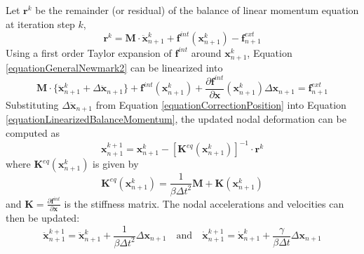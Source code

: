 \documentclass[oneside,11pt,times]{book}
\begin{document}
Let $\bm{r}^{k}$ be the remainder (or residual) of the balance of linear momentum equation at iteration step $k$,
%
\begin{equation} \label{equationResidualMomentum}
 \bm{r}^{k} = \bm{M} \cdot \ddot{\bm{x}}^{k}_{n+1} + \bm{f}^{int}(\bm{x}^{k}_{n+1}) -
 \bm{f}^{ext}_{n+1}
\end{equation}
%
Using a first order Taylor expansion of $\bm{f}^{int}$ around $\bm{x}^{k}_{n+1}$, Equation \eqref{equationGeneralNewmark2} can be linearized into
%
\begin{equation} \label{equationLinearizedBalanceMomentum}
 \bm{M} \cdot \{\ddot{\bm{x}}^{k}_{n+1} + \Delta \ddot{\bm{x}}_{n+1}\} + \bm{f}^{int}
 (\bm{x}^{k}_{n+1}) + \frac{\partial \bm{f}^{int}}{\partial \bm{x}}(\bm{x}^{k}_{n+1})
 \Delta \bm{x}_{n+1} = \bm{f}^{ext}_{n+1}
\end{equation}
%
Substituting $\Delta \ddot{\bm{x}}_{n+1}$ from Equation \eqref{equationCorrectionPosition} into Equation \eqref{equationLinearizedBalanceMomentum}, the updated nodal deformation can be computed as
%
\begin{equation} \label{equationUpdatedPosition}
 \bm{x}^{k+1}_{n+1} = \bm{x}^{k}_{n+1} - [\bm{K}^{eq}(\bm{x}^{k}_{n+1})]^{-1} \cdot \bm{r}^{k}
\end{equation}
%
where $\bm{K}^{eq}(\bm{x}^{k}_{n+1})$ is given by
%
\begin{equation} \label{equationJacobianMatrix}
 \bm{K}^{eq}(\bm{x}^{k}_{n+1}) = \frac{1}{\beta \Delta t^2} \bm{M} + \bm{K} (\bm{x}^{k}_{n+1})
\end{equation}
%
and $\bm{K} = \frac{\partial \bm{f}^{int}}{\partial \bm{x}}$ is the stiffness matrix. The nodal accelerations and velocities can then be updated:
%
\begin{equation} \label{equationUpdatedAccelerationVelocity}
 \ddot{\bm{x}}^{k+1}_{n+1} = \ddot{\bm{x}}^{k}_{n+1} + \frac{1}{\beta \Delta t^2} \Delta
 \bm{x}_{n+1} \quad \textrm{and} \quad  \dot{\bm{x}}^{k+1}_{n+1} = \dot{\bm{x}}^{k}_{n+1} +
 \frac{\gamma}{\beta \Delta t} \Delta \bm{x}_{n+1}
\end{equation}
\end{document}
